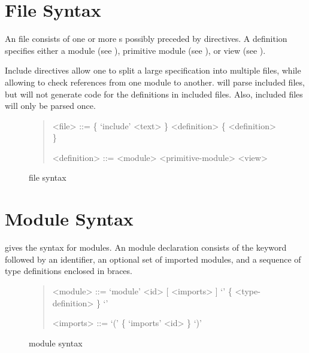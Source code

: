 \section{File Syntax}

An \asdl{} file consists of one or more s possibly preceded by 
directives.
A definition specifies either a module (see ),
primitive module (see ),
or view (see ).

Include directives allow one to split a large \asdl{} specification into multiple files,
while allowing \asdlgen{} to check references from one module to another.
\asdlgen{} will parse included files, but will not generate code for the definitions in included
files.
Also, included files will only be parsed once.

\begin{figure}[t]
  \begin{quote}
    \begin{grammar}
      <file>  ::=  \{ `include' <text> \} <definition> \{ <definition> \}
      
      <definition> ::= <module>
        \alt{} <primitive-module>
        \alt{} <view>
    \end{grammar}
  \end{quote}
  \caption{\asdl{} file syntax}
  \label{fig:file-syntax}
\end{figure}%

\section{Module Syntax}
\label{sec:module-syntax}

 gives the syntax for modules.
An \asdl{} module declaration consists of the keyword 
followed by an identifier, an optional set of imported modules, and a
sequence of type definitions enclosed in braces.

\begin{figure}[t]
  \begin{quote}
    \begin{grammar}
      <module>  ::=  `module' <id> [ <imports> ] `{' \{ <type-definition> \} `}'

      <imports> ::=  `(' \{ `imports' <id> \} `)'
    \end{grammar}
  \end{quote}
  \caption{\asdl{} module syntax}
  \label{fig:module-syntax}
\end{figure}%

